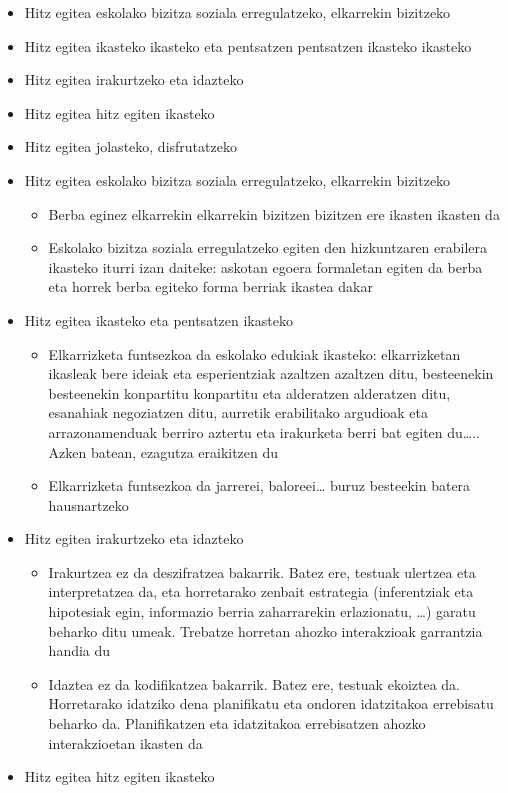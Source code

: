 \documentclass[
]{book}
\providecommand{\tightlist}{%
  \setlength{\itemsep}{0pt}\setlength{\parskip}{0pt}}
\begin{document}
\begin{itemize}
\tightlist
\item
  Hitz egitea eskolako bizitza soziala erregulatzeko, elkarrekin bizitzeko
\item
  Hitz egitea ikasteko ikasteko eta pentsatzen pentsatzen ikasteko ikasteko
\item
  Hitz egitea irakurtzeko eta idazteko
\item
  Hitz egitea hitz egiten ikasteko
\item
  Hitz egitea jolasteko, disfrutatzeko
\item
  Hitz egitea eskolako bizitza soziala erregulatzeko,
  elkarrekin bizitzeko

  \begin{itemize}
  \tightlist
  \item
    Berba eginez elkarrekin elkarrekin bizitzen bizitzen ere ikasten ikasten da
  \item
    Eskolako bizitza soziala erregulatzeko egiten den hizkuntzaren erabilera ikasteko iturri izan daiteke: askotan egoera formaletan egiten da berba eta horrek berba egiteko forma berriak ikastea dakar
  \end{itemize}
\item
  Hitz egitea ikasteko eta pentsatzen ikasteko

  \begin{itemize}
  \tightlist
  \item
    Elkarrizketa funtsezkoa da eskolako edukiak ikasteko: elkarrizketan ikasleak bere ideiak eta esperientziak azaltzen azaltzen ditu, besteenekin besteenekin konpartitu konpartitu eta alderatzen alderatzen ditu, esanahiak negoziatzen ditu, aurretik erabilitako argudioak eta arrazonamenduak berriro aztertu eta irakurketa berri bat egiten du\ldots.. Azken batean, ezagutza eraikitzen du
  \item
    Elkarrizketa funtsezkoa da jarrerei, baloreei\ldots{} buruz besteekin batera hausnartzeko
  \end{itemize}
\item
  Hitz egitea irakurtzeko eta idazteko

  \begin{itemize}
  \tightlist
  \item
    Irakurtzea ez da deszifratzea bakarrik. Batez ere, testuak ulertzea eta interpretatzea da, eta horretarako zenbait estrategia (inferentziak eta hipotesiak egin, informazio berria zaharrarekin erlazionatu, \ldots) garatu beharko ditu umeak. Trebatze horretan ahozko interakzioak garrantzia handia du
  \item
    Idaztea ez da kodifikatzea bakarrik. Batez ere, testuak ekoiztea da. Horretarako idatziko dena planifikatu eta ondoren idatzitakoa errebisatu beharko da. Planifikatzen eta idatzitakoa errebisatzen ahozko interakzioetan ikasten da
  \end{itemize}
\item
  Hitz egitea hitz egiten ikasteko


\end{itemize}
\end{document}
